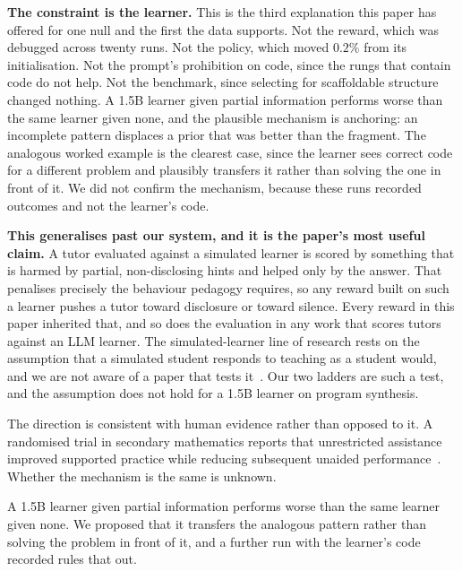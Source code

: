 \textbf{The constraint is the learner.} This is the third explanation this
paper has offered for one null and the first the data supports. Not the reward,
which was debugged across twenty runs. Not the policy, which moved $0.2\%$ from
its initialisation. Not the prompt's prohibition on code, since the rungs that
contain code do not help. Not the benchmark, since selecting for scaffoldable
structure changed nothing. A 1.5B learner given partial information performs
worse than the same learner given none, and the plausible mechanism is
anchoring: an incomplete pattern displaces a prior that was better than the
fragment. The analogous worked example is the clearest case, since the learner
sees correct code for a different problem and plausibly transfers it rather
than solving the one in front of it. We did not confirm the mechanism, because
these runs recorded outcomes and not the learner's code.

\textbf{This generalises past our system, and it is the paper's most useful
claim.} A tutor evaluated against a simulated learner is scored by something
that is harmed by partial, non-disclosing hints and helped only by the answer.
That penalises precisely the behaviour pedagogy requires, so any reward built
on such a learner pushes a tutor toward disclosure or toward silence. Every
reward in this paper inherited that, and so does the evaluation in any work
that scores tutors against an LLM learner. The simulated-learner line of
research rests on the assumption that a simulated student responds to teaching
as a student would, and we are not aware of a paper that tests
it~\cite{rev-simstudents}. Our two ladders are such a test, and the assumption
does not hold for a 1.5B learner on program synthesis.

The direction is consistent with human evidence rather than opposed to it.
A randomised trial in secondary mathematics reports that unrestricted
assistance improved supported practice while reducing subsequent unaided
performance~\cite{bastani}. Whether the mechanism is the same is unknown.


%
A 1.5B learner given partial information performs worse than the same learner
given none. We proposed that it transfers the analogous pattern rather than
solving the problem in front of it, and a further run with the learner's code
recorded rules that out.

